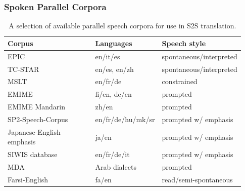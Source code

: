 \subsubsection{Spoken Parallel Corpora}

\begin{table}[ht]
\begin{center}
\begin{tabular}{>{\arraybackslash} m{0.42\linewidth} >{\arraybackslash} m{0.21\linewidth} >{\arraybackslash} m{0.3\linewidth}}
\bf Corpus & \bf Languages & \bf Speech style \\ \toprule
EPIC                                            & en/it/es              & spontaneous/interpreted   \\
TC-STAR                                         & en/es, en/zh          & spontaneous/interpreted   \\
MSLT                                            & en/fr/de              & constrained \\
EMIME                                           & fi/en, de/en          & prompted                  \\
EMIME Mandarin                                  & zh/en                & prompted                  \\
SP2-Speech-Corpus                               & en/fr/de/hu/mk/sr     & prompted w/ emphasis    \\
Japanese-English emphasis                       & ja/en                & prompted w/ emphasis    \\
SIWIS database                                  & en/fr/de/it           & prompted w/ emphasis    \\
MDA~\citep{almeman2013multi}                    & 4 Arab dialects  & prompted                  \\
Farsi-English~\citep{Melvin2004CreationOA}      & fa/en                 & read/semi-spontaneous     \\
\bottomrule
\end{tabular}
\end{center}
\caption{\label{sota:corpora} A selection of available parallel speech corpora for use in S2S translation. }
\end{table}

